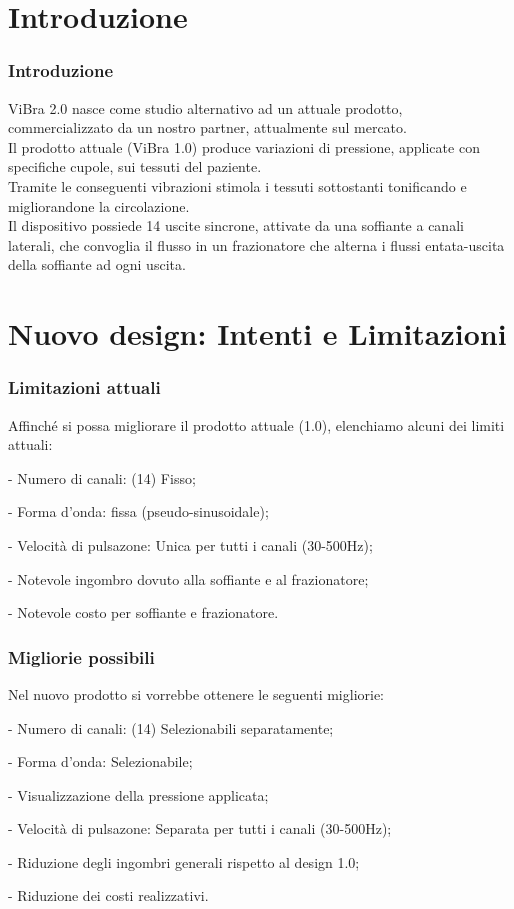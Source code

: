 \section{Introduzione}
\begin{frame}[fragile]
\frametitle{Introduzione}
ViBra 2.0 nasce come studio alternativo ad un attuale prodotto, commercializzato da un nostro partner, attualmente sul mercato.\\
Il prodotto attuale (ViBra 1.0) produce variazioni di pressione, applicate con specifiche cupole, sui tessuti del paziente.\\ Tramite le conseguenti vibrazioni stimola i tessuti sottostanti tonificando e migliorandone la circolazione.\\
Il dispositivo possiede 14 uscite sincrone, attivate da una soffiante a canali laterali, che convoglia il flusso in un frazionatore che alterna i flussi entata-uscita della soffiante ad ogni uscita.
\end{frame}

\section{Nuovo design: Intenti e Limitazioni}
\begin{frame}[fragile]
\frametitle{Limitazioni attuali}
Affinché si possa migliorare il prodotto attuale (1.0), elenchiamo alcuni dei limiti attuali:
\newline
\begin{list}{}{}
\item{- Numero di canali: (14) Fisso;}
\item{- Forma d'onda: fissa (pseudo-sinusoidale);}
\item{- Velocità  di pulsazone: Unica per tutti i canali (30-500Hz);}
\item{- Notevole ingombro dovuto alla soffiante e al frazionatore;}
\item{- Notevole costo per soffiante e frazionatore.}
\end{list}
\end{frame}

\begin{frame}[fragile]
\frametitle{Migliorie possibili}
Nel nuovo prodotto si vorrebbe ottenere le seguenti migliorie:
\newline
\begin{list}{}{}
\item{- Numero di canali: (14) Selezionabili separatamente;}
\item{- Forma d'onda: Selezionabile;}
\item{- Visualizzazione della pressione applicata;}
\item{- Velocità  di pulsazone: Separata per tutti i canali (30-500Hz);}
\item{- Riduzione degli ingombri generali rispetto al design 1.0;}
\item{- Riduzione dei costi realizzativi.}
\end{list}
\end{frame}

